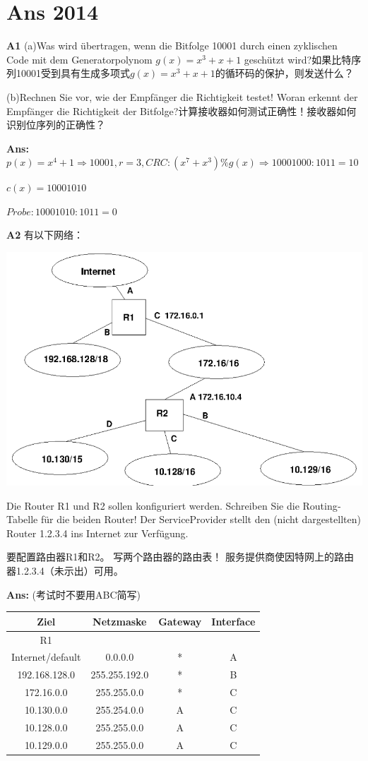 \documentclass[fleqn]{article}
\begin{document}
\section{Ans 2014}

\noindent\textbf{A1} (a)Was wird übertragen, wenn die Bitfolge 10001 durch einen zyklischen Code mit dem Generatorpolynom $g(x) = x^3 + x + 1$ geschützt wird?如果比特序列10001受到具有生成多项式$g(x) = x^3 + x + 1$的循环码的保护，则发送什么？

(b)Rechnen Sie vor, wie der Empfänger die Richtigkeit testet! Woran erkennt der Empfänger die Richtigkeit der Bitfolge?计算接收器如何测试正确性！接收器如何识别位序列的正确性？

\textbf{Ans:}$p(x)=x^4+1\Rightarrow10001,r=3,CRC:(x^7+x^3)\%g(x)\Rightarrow10001000:1011=10$

$c(x)=10001010$

$Probe:10001010:1011=0$

\noindent\textbf{A2} 有以下网络：

\begin{center}
    \includegraphics[scale=0.5]{bild3.png}
\end{center}

Die Router R1 und R2 sollen konfiguriert werden. Schreiben Sie die Routing­Tabelle für die beiden Router! Der Service­Provider stellt den (nicht dargestellten) Router 1.2.3.4 ins Internet zur Verfügung.

要配置路由器R1和R2。 写两个路由器的路由表！ 服务提供商使因特网上的路由器1.2.3.4（未示出）可用。

\textbf{Ans:} (考试时不要用ABC简写)

\begin{tabular}{|c|c|c|c|}
    \hline
    Ziel&Netzmaske&Gateway&Interface\\
    \hline
    R1\\
    \hline
    Internet/default&0.0.0.0&*&A\\
    \hline
    192.168.128.0&255.255.192.0&*&B\\
    \hline
    172.16.0.0&255.255.0.0&*&C\\
    \hline
    10.130.0.0&255.254.0.0&A&C\\
    \hline
    10.128.0.0&255.255.0.0&A&C\\
    \hline
    10.129.0.0&255.255.0.0&A&C\\
    \hline
\end{tabular}
\end{document}
